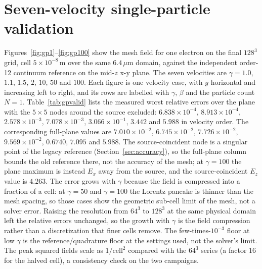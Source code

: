 \section{Seven-velocity single-particle validation}
\label{app:sweep}

Figures~\ref{fig:gp1}--\ref{fig:gp100} show the mesh field for one
electron on the final $128^3$ grid, cell $5\times10^{-8}$\,m over the same
$6.4\,\mu$m domain, against the independent order-12 continuum reference on
the mid-$z$ x-y plane. The seven velocities are $\gamma=1.0$, $1.1$, $1.5$,
$2$, $10$, $50$ and $100$. Each figure is one velocity case, with $y$
horizontal and increasing left to right, and its rows are labelled with
$\gamma$, $\beta$ and the particle count $N=1$. Table~\ref{tab:gpvalid}
lists the measured worst relative errors over the plane with the $5\times5$
nodes around the source excluded: $6.838\times10^{-4}$,
$8.913\times10^{-4}$, $2.578\times10^{-3}$, $7.078\times10^{-3}$,
$3.066\times10^{-1}$, $3.442$ and $5.988$ in velocity order. The
corresponding full-plane values are
$7.010\times10^{-2}$, $6.745\times10^{-2}$, $7.726\times10^{-2}$,
$9.569\times10^{-2}$, $0.6740$, $7.095$ and $5.988$. The source-coincident
node is a singular point of the legacy reference
(Section~\ref{sec:accuracy}), so the full-plane column bounds the old
reference there, not the accuracy of the mesh; at $\gamma=100$ the plane
maximum is instead $E_x$ away from the source, and the source-coincident
$E_z$ value is $4.263$. The
error grows with $\gamma$ because the field is compressed into a fraction of
a cell: at $\gamma=50$ and $\gamma=100$ the Lorentz pancake is thinner than
the mesh spacing, so those cases show the geometric sub-cell limit of the
mesh, not a solver error. Raising the resolution from $64^3$ to $128^3$ at
the same physical domain left the relative errors unchanged, so the growth
with $\gamma$ is the field compression rather than a discretization that
finer cells remove. The few-times-$10^{-3}$ floor at low $\gamma$ is the
reference/quadrature floor at the settings used, not the solver's limit.
The peak squared fields scale as $1/\text{cell}^2$ compared with the
$64^3$ series (a factor $16$ for the halved cell), a consistency check on
the two campaigns.

